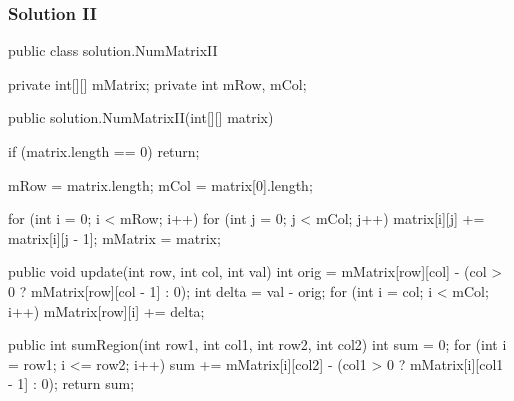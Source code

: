 \newpage

\subsubsection{Solution II}

\begin{Code}
public class solution.NumMatrixII {
    private int[][] mMatrix;
    private int mRow, mCol;

    public solution.NumMatrixII(int[][] matrix) {
        if (matrix.length == 0) {
            return;
        }

        mRow = matrix.length;
        mCol = matrix[0].length;

        for (int i = 0; i < mRow; i++) {
            for (int j = 0; j < mCol; j++) {
                matrix[i][j] += matrix[i][j - 1];
            }
        }
        mMatrix = matrix;
    }

    public void update(int row, int col, int val) {
        int orig = mMatrix[row][col] - (col > 0 ? mMatrix[row][col - 1] : 0);
        int delta = val - orig;
        for (int i = col; i < mCol; i++) {
            mMatrix[row][i] += delta;
        }
    }

    public int sumRegion(int row1, int col1, int row2, int col2) {
        int sum = 0;
        for (int i = row1; i <= row2; i++) {
            sum += mMatrix[i][col2] - (col1 > 0 ? mMatrix[i][col1 - 1] : 0);
        }
        return sum;
    }
}
\end{Code}

\newpage